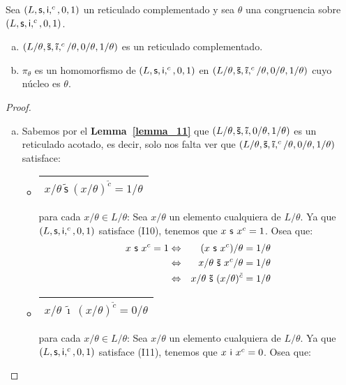   \begin{lemma} \label{lemma_19}
    \PN Sea $(L, \mathsf{s}, \mathsf{i}, ^{c}, 0, 1)$ un reticulado complementado y sea $\theta$ una congruencia sobre $(L, \mathsf{s}, \mathsf{i}, ^{c}, 0, 1)$.
    \begin{enumerate}[a)]
      \item $(L/\theta, \mathsf{\tilde{s}}, \mathsf{\tilde{\imath}}, ^{c}/\theta, 0/\theta, 1/\theta)$ es un reticulado complementado.
      \item $\pi_{\theta}$ es un homomorfismo de $(L, \mathsf{s}, \mathsf{i}, ^{c}, 0, 1)$ en $(L/\theta, \mathsf{\tilde{s}}, \mathsf{\tilde{\imath}}, ^{c}/\theta, 0/\theta, 1/\theta)$ cuyo núcleo es $\theta$.
    \end{enumerate}
  \end{lemma}
  \begin{proof}
    \PN \newline
    \begin{enumerate}[a)]
      \item Sabemos por el \textbf{Lemma~\ref{lemma_11}} que $(L/\theta, \mathsf{\tilde{s}}, \mathsf{\tilde{\imath}}, 0/\theta, 1/\theta)$ es un reticulado acotado, es decir,
      solo nos falta ver que $(L/\theta, \mathsf{\tilde{s}}, \mathsf{\tilde{\imath}}, ^{c}/\theta, 0/\theta, 1/\theta)$ satisface:
      \begin{itemize}
        \item \begin{tabular}{|c|} \hline $x/\theta \ \mathsf{\tilde{s}} \ (x/\theta)^{\tilde{c}} = 1/\theta$ \\\hline
          \end{tabular} para cada $x/\theta \in L/\theta$: Sea $x/\theta$ un elemento cualquiera de $L/\theta$. Ya que
          $(L, \mathsf{s}, \mathsf{i}, ^{c}, 0, 1)$ satisface (I10), tenemos que $x \ \mathsf{s} \ x^{c} = 1$. Osea que:
          \begin{eqnarray*}
            x \ \SU \ x^{c} = 1 &\Leftrightarrow& (x \ \SU \ x^{c})/\theta = 1/\theta \\
            &\Leftrightarrow& x/\theta \ \mathsf{\tilde{s}} \ x^{c}/\theta = 1/\theta \\
            &\Leftrightarrow& x/\theta \ \mathsf{\tilde{s}} \ (x/\theta)^{\tilde{c}} = 1/\theta
          \end{eqnarray*}
        \item \begin{tabular}{|c|} \hline $x/\theta \ \mathsf{\tilde{\imath}} \ (x/\theta)^{\tilde{c}} = 0/\theta$ \\
          \hline \end{tabular} para cada $x/\theta \in L/\theta$: Sea $x/\theta$ un elemento cualquiera de $L/\theta$.
          Ya que $(L, \mathsf{s}, \mathsf{i}, ^{c}, 0, 1)$ satisface (I11), tenemos que $x \ \mathsf{i} \ x^{c} = 0$. Osea que:

\end{itemize}
\end{enumerate}
\end{proof}
